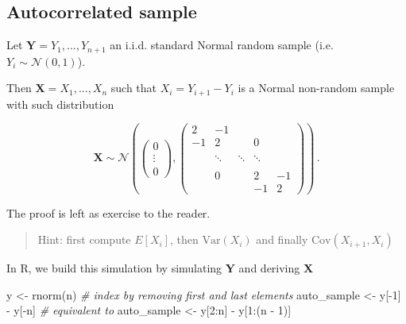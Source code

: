 \documentclass[
  oneside]{book}
\newenvironment{Shaded}{\begin{snugshade}}{\end{snugshade}}
\newcommand{\CommentTok}[1]{\textcolor[rgb]{0.56,0.35,0.01}{\textit{#1}}}
\newcommand{\DecValTok}[1]{\textcolor[rgb]{0.00,0.00,0.81}{#1}}
\newcommand{\FunctionTok}[1]{\textcolor[rgb]{0.00,0.00,0.00}{#1}}
\newcommand{\NormalTok}[1]{#1}
\newcommand{\OtherTok}[1]{\textcolor[rgb]{0.56,0.35,0.01}{#1}}
\newcommand{\SpecialCharTok}[1]{\textcolor[rgb]{0.00,0.00,0.00}{#1}}
\begin{document}
\hypertarget{autocorrelated-sample}{%
\subsection{Autocorrelated sample}\label{autocorrelated-sample}}

Let \(\mathbf{Y} = Y_1, ..., Y_{n+1}\) an i.i.d. standard
Normal random sample (i.e.~\(Y_i \sim \mathcal{N}(0, 1)\)).

Then \(\mathbf{X} = X_1, ..., X_n\) such that \(X_i = Y_{i+1} - Y_i\) is
a Normal non-random sample with such distribution

\[
\mathbf{X} \sim \mathcal{N}\left(
\begin{pmatrix}
0 \\ \vdots \\ 0
\end{pmatrix}, 
\begin{pmatrix}
2 & -1 &  &  &  \\
-1 & 2 & & 0 & \\
 & & & & \\
 & \ddots & \ddots & \ddots &  \\
 & & & &  \\
 & 0 & & 2 & -1 \\
 & & & -1 & 2
\end{pmatrix}
\right)\,.
\]

The proof is left as exercise to the reader.

\begin{quote}
Hint: first compute \(E[X_i]\), then \(\text{Var}(X_i)\) and finally \(\text{Cov}(X_{i+1}, X_i)\)
\end{quote}

In R, we build this simulation by simulating \(\mathbf Y\) and deriving \(\mathbf X\)

\begin{Shaded}
\begin{Highlighting}[]
\NormalTok{y }\OtherTok{\textless{}{-}} \FunctionTok{rnorm}\NormalTok{(n)}
\CommentTok{\# index by removing first and last elements}
\NormalTok{auto\_sample }\OtherTok{\textless{}{-}}\NormalTok{ y[}\SpecialCharTok{{-}}\DecValTok{1}\NormalTok{] }\SpecialCharTok{{-}}\NormalTok{ y[}\SpecialCharTok{{-}}\NormalTok{n]}
\CommentTok{\# equivalent to}
\NormalTok{auto\_sample }\OtherTok{\textless{}{-}}\NormalTok{ y[}\DecValTok{2}\SpecialCharTok{:}\NormalTok{n] }\SpecialCharTok{{-}}\NormalTok{ y[}\DecValTok{1}\SpecialCharTok{:}\NormalTok{(n }\SpecialCharTok{{-}} \DecValTok{1}\NormalTok{)]}
\end{Highlighting}
\end{Shaded}
\end{document}
